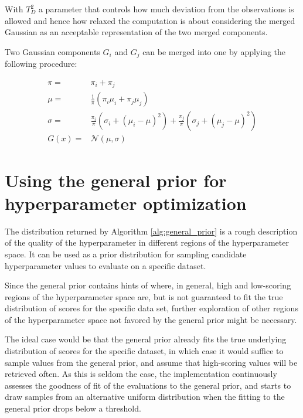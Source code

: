 	With $T_D^2$ a parameter that controls how much deviation from the observations is allowed and
	hence how relaxed the computation is about considering the merged Gaussian as an acceptable
	representation of the two merged components.

	Two Gaussian components $G_i$ and $G_j$ can be merged into one by applying the following
	procedure:

	\begin{align}
		\pi = & \pi_i + \pi_j\\
		\mu = & \frac 1 \pi \left( \pi_i \mu_i + \pi_j \mu_j\right)\\
		\sigma = & \frac {\pi_i} {\pi} \left( \sigma_i + (\mu_i - \mu)^2 \right) + 
			      \frac {\pi_j} \pi \left( \sigma_j + (\mu_j - \mu)^2 \right) \\
				  G(x) = & \mathcal{N}(\mu, \sigma)
				  \label{eq:simplify_gaussians}
	\end{align}
	
	\section{Using the general prior for hyperparameter optimization}

	The distribution returned by Algorithm \ref{alg:general_prior} is a rough description of the
	quality of the hyperparameter in different regions of the hyperparameter space. It can be used
	as a prior distribution for sampling candidate hyperparameter values to evaluate on a
	specific dataset.

	Since the general prior contains hints of where, in general, high and low-scoring regions of the
	hyperparameter space are, but is not guaranteed to fit the true distribution of scores for the
	specific data set, further exploration of other regions of the hyperparameter space not
	favored by the general prior might be necessary.
	
	The ideal case would be that the general prior already fits the true underlying distribution of
	scores for the specific dataset, in which case it would suffice to sample values from the
	general prior, and assume that high-scoring values will be retrieved often. As this is seldom
	the case, the implementation continuously assesses the goodness of fit of the evaluations to the
	general prior, and starts to draw samples from an alternative uniform distribution when the
	fitting to the general prior drops below a threshold.


